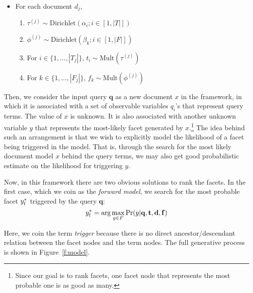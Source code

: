 \begin{itemize} 
  \item For each document $d_j$, \begin{enumerate}
    \item $\tau^{(j)} \sim \textrm{Dirichlet}(\alpha_i; i \in [1, |T|])$
    \item $\phi^{(j)} \sim \textrm{Dirichlet}(\beta_k; i \in [1, |F|])$
    \item For $i \in \{ 1, \ldots, |T_j| \}$, $t_i \sim \textrm{Mult}(\tau^{(j)})$ 
    \item For $k \in \{ 1, \ldots, |F_j| \}$, $f_k \sim \textrm{Mult}(\phi^{(j)})$ 
  \end{enumerate}
\end{itemize}

Then, we consider the input query $\mathbf{q}$ as a new document $x$ in the
framework, in which it is associated with a set of observable variables $q_i$'s that represent
query terms.  The value of $x$ is unknown.  It is also associated
with another unknown variable $y$ that represents the most-likely facet generated by
$x$.\footnote{Since our goal is to rank facets, one facet node that represents the most
probable one is as good as many.} The idea behind such an arrangement is that
we wish to explicitly model the likelihood of a facet being triggered in the
model.  That is, through the search for the most likely document model $x$
behind the query terms, we may also get good probabilistic estimate on the
likelihood for triggering $y$.

Now, in this framework there are two obvious solutions to rank the facets.  In
the first case, which we coin as the \emph{forward model}, we search for the
most probable facet $y^*_{\rm f}$ triggered by the query $\mathbf{q}$:
\[ y^*_{\rm f} = \arg\max_{y \in F} \Pr(y|\mathbf{q}, \mathbf{t},
\mathbf{d}, \mathbf{f}) \label{eq:forward} \]


Here, we coin the term \emph{trigger} because there is no direct
ancestor/descendant relation between the facet nodes and the term nodes.  The
full generative process is shown in Figure~\ref{f:model}.  

